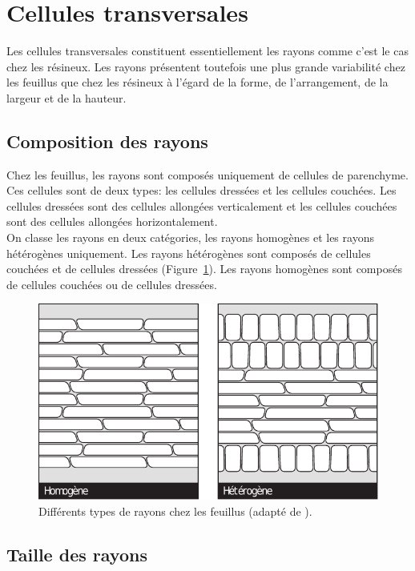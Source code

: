 \section{Cellules transversales}

Les cellules transversales constituent essentiellement les rayons comme c'est le cas chez les résineux. Les rayons présentent toutefois une plus grande variabilité chez les feuillus que chez les résineux à l'égard de la forme, de l'arrangement, de la largeur et de la hauteur.


\subsection{Composition des rayons}

Chez les feuillus, les rayons sont composés uniquement de cellules de parenchyme. Ces cellules sont de deux types: les cellules dressées et les cellules couchées. Les cellules dressées sont des cellules allongées verticalement et les cellules couchées sont des cellules allongées horizontalement.\\

On classe les rayons en deux catégories, les rayons homogènes et les rayons hétérogènes uniquement. Les rayons hétérogènes sont composés de cellules couchées et de cellules dressées (Figure~\ref{fig:rayons_feuillus}). Les rayons homogènes sont composés de cellules couchées ou de cellules dressées.

\begin{figure}[h]
\centering
\includegraphics[scale=0.75]{img/ch4_rayons}
\caption{Différents types de rayons chez les feuillus (adapté de \cite{jane1970structure}).}
\label{fig:rayons_feuillus}
\end{figure}

\subsection{Taille des rayons}

